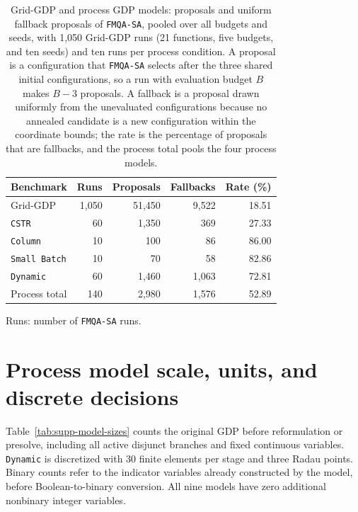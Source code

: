 \begin{table}[htbp]
\centering
\caption{Grid-GDP and process GDP models: proposals and uniform fallback proposals of \texttt{FMQA-SA}, pooled over all budgets and seeds, with 1,050 Grid-GDP runs (21 functions, five budgets, and ten seeds) and ten runs per process condition.
A proposal is a configuration that \texttt{FMQA-SA} selects after the three shared initial configurations, so a run with evaluation budget \(B\) makes \(B-3\) proposals.
A fallback is a proposal drawn uniformly from the unevaluated configurations because no annealed candidate is a new configuration within the coordinate bounds; the rate is the percentage of proposals that are fallbacks, and the process total pools the four process models.}
\label{tab:supp-fmqa-fallback}
\footnotesize
\begin{threeparttable}
\begin{tabular}{@{}lrrrr@{}}
\toprule
Benchmark & Runs & Proposals & Fallbacks & Rate (\%) \\
\midrule
Grid-GDP & 1,050 & 51,450 & 9,522 & 18.51 \\
\midrule
\texttt{CSTR} & 60 & 1,350 & 369 & 27.33 \\
\texttt{Column} & 10 & 100 & 86 & 86.00 \\
\texttt{Small Batch} & 10 & 70 & 58 & 82.86 \\
\texttt{Dynamic} & 60 & 1,460 & 1,063 & 72.81 \\
\addlinespace[2pt]
Process total & 140 & 2,980 & 1,576 & 52.89 \\
\bottomrule
\end{tabular}
\begin{tablenotes}[flushleft]\footnotesize
\item Runs: number of \texttt{FMQA-SA} runs.
\end{tablenotes}
\end{threeparttable}
\end{table}
\FloatBarrier

\section{Process model scale, units, and discrete decisions}\label{sec:supp-models}
Table~\ref{tab:supp-model-sizes} counts the original GDP before reformulation or presolve, including all active disjunct branches and fixed continuous variables.
\texttt{Dynamic} is discretized with 30 finite elements per stage and three Radau points.
Binary counts refer to the indicator variables already constructed by the model, before Boolean-to-binary conversion.
All nine models have zero additional nonbinary integer variables.

